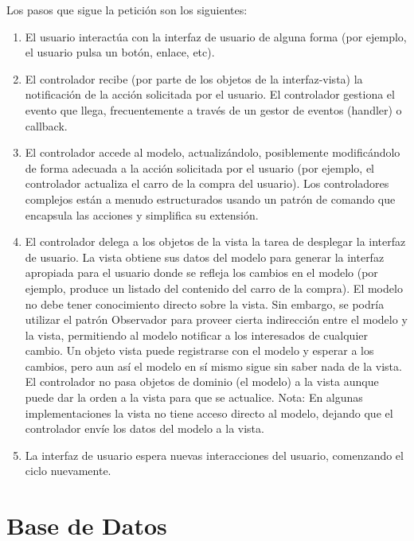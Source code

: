 		    Los pasos que sigue la petici\'on son los siguientes:
		    \begin{enumerate}

		    	\item El usuario interact\'ua con la interfaz de usuario de alguna forma (por ejemplo, el usuario pulsa un bot\'on, enlace, etc).

		    	\item El controlador recibe (por parte de los objetos de la interfaz-vista) la notificaci\'on de la acci\'on solicitada por el usuario. El controlador gestiona el evento que llega, frecuentemente a trav\'es de un gestor de eventos (handler) o callback. 

		    	\item El controlador accede al modelo, actualiz\'andolo, posiblemente modific\'andolo de forma adecuada a la acci\'on solicitada por el usuario (por ejemplo, el controlador actualiza el carro de la compra del usuario). Los controladores complejos est\'an a menudo estructurados usando un patr\'on de comando que encapsula las acciones y simplifica su extensi\'on. 

		    	\item El controlador delega a los objetos de la vista la tarea de desplegar la interfaz de usuario. La vista obtiene sus datos del modelo para generar la interfaz apropiada para el usuario donde se refleja los cambios en el modelo (por ejemplo, produce un listado del contenido del carro de la compra). El modelo no debe tener conocimiento directo sobre la vista. Sin embargo, se podr\'ia utilizar el patr\'on Observador para proveer cierta indirecci\'on entre el modelo y la vista, permitiendo al modelo notificar a los interesados de cualquier cambio. Un objeto vista puede registrarse con el modelo y esperar a los cambios, pero aun as\'i el modelo en s\'i mismo sigue sin saber nada de la vista. El controlador no pasa objetos de dominio (el modelo) a la vista aunque puede dar la orden a la vista para que se actualice. Nota: En algunas implementaciones la vista no tiene acceso directo al modelo, dejando que el controlador envíe los datos del modelo a la vista.

		    	\item La interfaz de usuario espera nuevas interacciones del usuario, comenzando el ciclo nuevamente.
		    \end{enumerate}


\section{Base de Datos}

